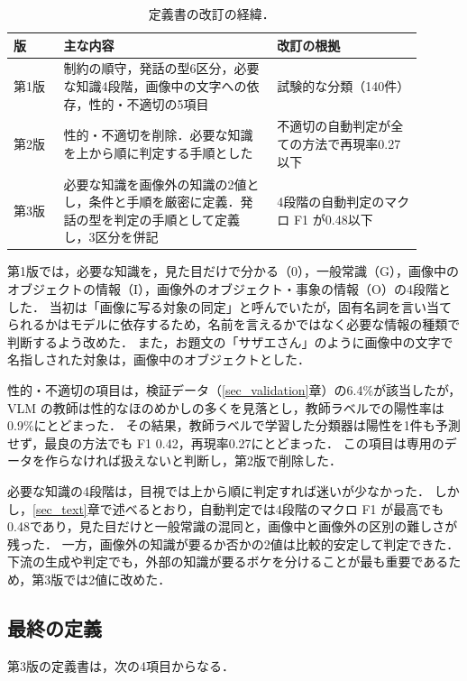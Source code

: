 \begin{table}[t]
    \centering
    \caption{定義書の改訂の経緯．}
    \label{tab_versions}
    \small
    \begin{tabular}{@{}p{0.11\linewidth}p{0.47\linewidth}p{0.32\linewidth}@{}}
        \toprule
        版 & 主な内容 & 改訂の根拠 \\
        \midrule
        第1版 & 制約の順守，発話の型6区分，必要な知識4段階，画像中の文字への依存，性的・不適切の5項目 & 試験的な分類（140件） \\
        第2版 & 性的・不適切を削除．必要な知識を上から順に判定する手順とした & 不適切の自動判定が全ての方法で再現率0.27以下 \\
        第3版 & 必要な知識を画像外の知識の2値とし，条件と手順を厳密に定義．発話の型を判定の手順として定義し，3区分を併記 & 4段階の自動判定のマクロ F1 が0.48以下 \\
        \bottomrule
    \end{tabular}
\end{table}

第1版では，必要な知識を，見た目だけで分かる（0），一般常識（G），画像中のオブジェクトの情報（I），画像外のオブジェクト・事象の情報（O）の4段階とした．
当初は「画像に写る対象の同定」と呼んでいたが，固有名詞を言い当てられるかはモデルに依存するため，名前を言えるかではなく必要な情報の種類で判断するよう改めた．
また，お題文の「サザエさん」のように画像中の文字で名指しされた対象は，画像中のオブジェクトとした．

性的・不適切の項目は，検証データ（\ref{sec_validation}章）の6.4\%が該当したが，VLM の教師は性的なほのめかしの多くを見落とし，教師ラベルでの陽性率は0.9\%にとどまった．
その結果，教師ラベルで学習した分類器は陽性を1件も予測せず，最良の方法でも F1 0.42，再現率0.27にとどまった．
この項目は専用のデータを作らなければ扱えないと判断し，第2版で削除した．

必要な知識の4段階は，目視では上から順に判定すれば迷いが少なかった．
しかし，\ref{sec_text}章で述べるとおり，自動判定では4段階のマクロ F1 が最高でも0.48であり，見た目だけと一般常識の混同と，画像中と画像外の区別の難しさが残った．
一方，画像外の知識が要るか否かの2値は比較的安定して判定できた．
下流の生成や判定でも，外部の知識が要るボケを分けることが最も重要であるため，第3版では2値に改めた．

\subsection{最終の定義}
第3版の定義書は，次の4項目からなる．

